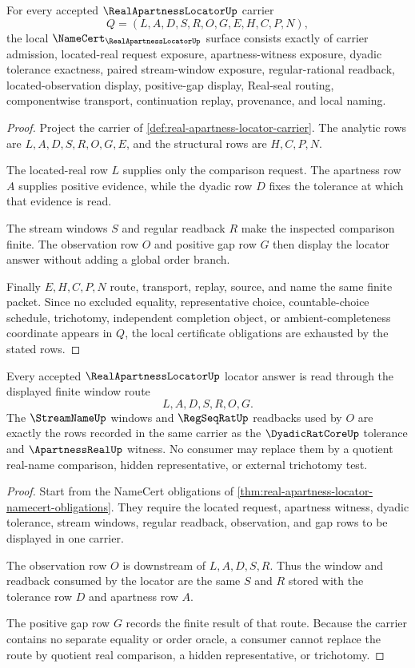 \begin{theorem}
\label{thm:real-apartness-locator-namecert-obligations}
For every accepted $\RealApartnessLocatorUp$ carrier
$$
Q=(L,A,D,S,R,O,G,E,H,C,P,N),
$$
the local $\NameCert_{\RealApartnessLocatorUp}$ surface consists exactly of carrier admission, located-real request exposure, apartness-witness exposure, dyadic tolerance exactness, paired stream-window exposure, regular-rational readback, located-observation display, positive-gap display, Real-seal routing, componentwise transport, continuation replay, provenance, and local naming.
\end{theorem}
\begin{proof}
Project the carrier of \autoref{def:real-apartness-locator-carrier}. The analytic rows are $L,A,D,S,R,O,G,E$, and the structural rows are $H,C,P,N$.

The located-real row $L$ supplies only the comparison request. The apartness row $A$ supplies positive evidence, while the dyadic row $D$ fixes the tolerance at which that evidence is read.

The stream windows $S$ and regular readback $R$ make the inspected comparison finite. The observation row $O$ and positive gap row $G$ then display the locator answer without adding a global order branch.

Finally $E,H,C,P,N$ route, transport, replay, source, and name the same finite packet. Since no excluded equality, representative choice, countable-choice schedule, trichotomy, independent completion object, or ambient-completeness coordinate appears in $Q$, the local certificate obligations are exhausted by the stated rows.
\end{proof}

\begin{theorem}
\label{thm:real-apartness-locator-window-exactness}
Every accepted $\RealApartnessLocatorUp$ locator answer is read through the displayed finite window route
$$
L,A,D,S,R,O,G .
$$
The $\StreamNameUp$ windows and $\RegSeqRatUp$ readbacks used by $O$ are exactly the rows recorded in the same carrier as the $\DyadicRatCoreUp$ tolerance and $\ApartnessRealUp$ witness. No consumer may replace them by a quotient real-name comparison, hidden representative, or external trichotomy test.
\end{theorem}
\begin{proof}
Start from the NameCert obligations of \autoref{thm:real-apartness-locator-namecert-obligations}. They require the located request, apartness witness, dyadic tolerance, stream windows, regular readback, observation, and gap rows to be displayed in one carrier.

The observation row $O$ is downstream of $L,A,D,S,R$. Thus the window and readback consumed by the locator are the same $S$ and $R$ stored with the tolerance row $D$ and apartness row $A$.

The positive gap row $G$ records the finite result of that route. Because the carrier contains no separate equality or order oracle, a consumer cannot replace the route by quotient real comparison, a hidden representative, or trichotomy.
\end{proof}

